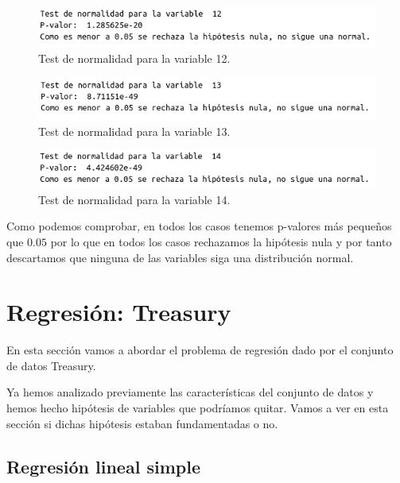 \documentclass[12pt,a4paper]{article}
\begin{document}
\begin{figure}[H]
	\centering
	\includegraphics[scale=0.6]{./Imagenes/EDA/Clasificacion/test_normalidad12.png}
	\caption{Test de normalidad para la variable 12.}
\end{figure}

\begin{figure}[H]
	\centering
	\includegraphics[scale=0.6]{./Imagenes/EDA/Clasificacion/test_normalidad13.png}
	\caption{Test de normalidad para la variable 13.}
\end{figure}

\begin{figure}[H]
	\centering
	\includegraphics[scale=0.6]{./Imagenes/EDA/Clasificacion/test_normalidad14.png}
	\caption{Test de normalidad para la variable 14.}
\end{figure}

Como podemos comprobar, en todos los casos tenemos p-valores más pequeños que $0.05$ por lo que en todos los casos rechazamos la hipótesis nula y por tanto descartamos que ninguna de las variables siga una distribución normal.

\section{Regresión: Treasury}

En esta sección vamos a abordar el problema de regresión dado por el conjunto de datos Treasury.

Ya hemos analizado previamente las características del conjunto de datos y hemos hecho hipótesis de variables que podríamos quitar. Vamos a ver en esta sección si dichas hipótesis estaban fundamentadas o no.

\subsection{Regresión lineal simple}
\end{document}
